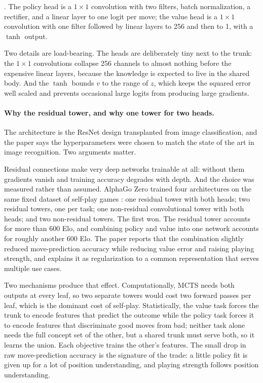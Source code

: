 \citep{silver2017alphagozero}. The policy head is a $1\times1$ convolution with
two filters, batch normalization, a rectifier, and a linear layer to one logit
per move; the value head is a $1\times1$ convolution with one filter followed by
linear layers to 256 and then to 1, with a $\tanh$ output.

Two details are load-bearing. The heads are deliberately tiny next to the trunk:
the $1\times1$ convolutions collapse 256 channels to almost nothing before the
expensive linear layers, because the knowledge is expected to live in the shared
body. And the $\tanh$ bounds $v$ to the range of $z$, which keeps the squared
error well scaled and prevents occasional large logits from producing large
gradients.

\paragraph{Why the residual tower, and why one tower for two heads.} The
architecture is the ResNet design \citep{he2016resnet} transplanted from image
classification, and the paper says the hyperparameters were chosen to match the
state of the art in image recognition. Two arguments matter.

Residual connections make very deep networks trainable at all: without them
gradients vanish and training accuracy degrades with depth. And the choice was
measured rather than assumed. AlphaGo Zero trained four architectures on the same
fixed dataset of self-play games \citep{silver2017alphagozero}: one residual
tower with both heads; two residual towers, one per task; one non-residual
convolutional tower with both heads; and two non-residual towers. The first won.
The residual tower accounts for more than 600 Elo, and combining policy and value
into one network accounts for roughly another 600 Elo. The paper reports that
the combination slightly reduced move-prediction accuracy while reducing value
error and raising playing strength, and explains it as regularization to a common
representation that serves multiple use cases.

Two mechanisms produce that effect. Computationally, MCTS needs both outputs at
every leaf, so two separate towers would cost two forward passes per leaf, which
is the dominant cost of self-play. Statistically, the value task forces the trunk
to encode features that predict the outcome while the policy task forces it to
encode features that discriminate good moves from bad; neither task alone needs
the full concept set of the other, but a shared trunk must serve both, so it
learns the union. Each objective trains the other's features. The small drop in
raw move-prediction accuracy is the signature of the trade: a little policy fit
is given up for a lot of position understanding, and playing strength follows
position understanding.


